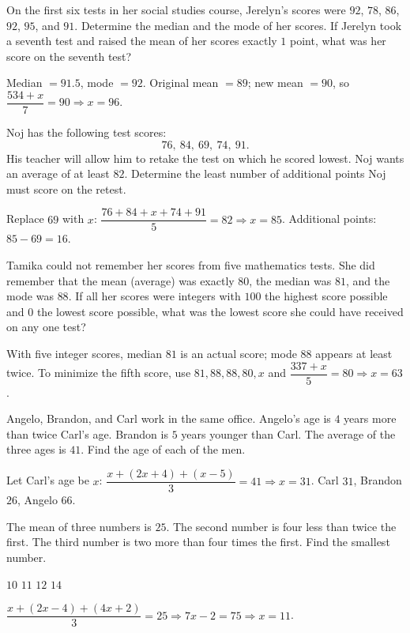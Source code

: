 \question[10]
On the first six tests in her social studies course, Jerelyn's scores were $92$, $78$, $86$, $92$, $95$, and $91$. Determine the median and the mode of her scores. If Jerelyn took a seventh test and raised the mean of her scores exactly $1$ point, what was her score on the seventh test?
\makeemptybox{2in}
\begin{solution}
  Median $=91.5$, mode $=92$. Original mean $=89$; new mean $=90$, so $\dfrac{534+x}{7}=90\Rightarrow x=96$.
\end{solution}


\newpage



\question[10]
Noj has the following test scores:
\[
  76,\ 84,\ 69,\ 74,\ 91\text{.}
\]
His teacher will allow him to retake the test on which he scored lowest. Noj wants an average of at least $82$. Determine the least number of additional points Noj must score on the retest.
\makeemptybox{1.6in}
\begin{solution}
  Replace $69$ with $x$: $\dfrac{76+84+x+74+91}{5}=82\Rightarrow x=85$. Additional points: $85-69=16$.
\end{solution}

\question[10]
Tamika could not remember her scores from five mathematics tests. She did remember that the mean (average) was exactly $80$, the median was $81$, and the mode was $88$. If all her scores were integers with $100$ the highest score possible and $0$ the lowest score possible, what was the lowest score she could have received on any one test?
\makeemptybox{2in}
\begin{solution}
  With five integer scores, median $81$ is an actual score; mode $88$ appears at least twice. To minimize the fifth score, use $81,88,88,80,x$ and $\dfrac{337+x}{5}=80\Rightarrow x=63$.
\end{solution}


\newpage



\question[10]
Angelo, Brandon, and Carl work in the same office. Angelo's age is $4$ years more than twice Carl's age. Brandon is $5$ years younger than Carl. The average of the three ages is $41$. Find the age of each of the men.
\makeemptybox{2.2in}
\begin{solution}
  Let Carl's age be $x$: $\dfrac{x+(2x+4)+(x-5)}{3}=41\Rightarrow x=31$. Carl $31$, Brandon $26$, Angelo $66$.
\end{solution}

\question[5]
The mean of three numbers is $25$. The second number is four less than twice the first. The third number is two more than four times the first. Find the smallest number.
\begin{choices}
  \choice $10$
  \CorrectChoice $11$
  \choice $12$
  \choice $14$
\end{choices}
\begin{solution}
  $\dfrac{x+(2x-4)+(4x+2)}{3}=25\Rightarrow 7x-2=75\Rightarrow x=11$.
\end{solution}

